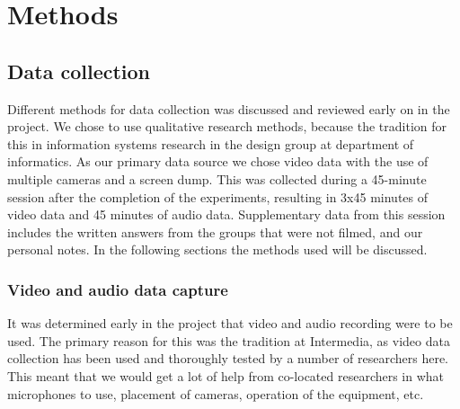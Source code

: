 \section{Methods}
\subsection{Data collection}
Different methods for data collection was discussed and reviewed early on in the project. We chose to use qualitative research methods, because the tradition for this in information systems research in the design group at department of informatics. As our primary data source we chose video data with the use of multiple cameras and a screen dump. This was collected during a 45-minute session after the completion of the experiments, resulting in 3x45 minutes of video data and 45 minutes of audio data. Supplementary data from this session includes the written answers from the groups that were not filmed, and our personal notes. In the following sections the methods used will be discussed. 

\subsubsection{Video and audio data capture}
It was determined early in the project that video and audio recording were to be used. The primary reason for this was the tradition at Intermedia, as video data collection has been used and thoroughly tested by a number of researchers here. This meant that we would get a lot of help from co-located researchers in what microphones to use, placement of cameras, operation of the equipment, etc. 

